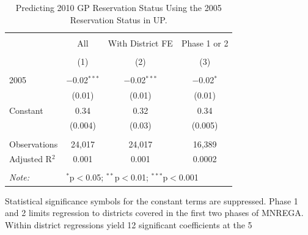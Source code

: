 \begin{table}[!htbp]
\centering
\begin{threeparttable}

  \caption{Predicting 2010 GP Reservation Status Using the 2005 Reservation Status in UP.} 
  \label{rand_or_no_up} 
\scriptsize 
\begin{tabular}{@{\extracolsep{0pt}}lccc} 
\\[-1.8ex]\hline 
\hline \\[-1.8ex] 
 & All & With District FE & Phase 1 or 2 \\ 
\\[-1.8ex] & (1) & (2) & (3)\\ 
\hline \\[-1.8ex] 
 2005 & $-$0.02$^{***}$ & $-$0.02$^{***}$ & $-$0.02$^{*}$ \\ 
  & (0.01) & (0.01) & (0.01) \\ 
  Constant & 0.34 & 0.32 & 0.34 \\ 
  & (0.004) & (0.03) & (0.005) \\ 
 \hline \\[-1.8ex] 
Observations & 24,017 & 24,017 & 16,389 \\ 
Adjusted R$^{2}$ & 0.001 & 0.001 & 0.0002 \\ 
\hline 
\hline \\[-1.8ex] 
\textit{Note:}  & \multicolumn{3}{l}{$^{*}$p$<$0.05; $^{**}$p$<$0.01; $^{***}$p$<$0.001} \\ 
\end{tabular} 
\begin{tablenotes}[flushleft]
\scriptsize
\item[] Statistical significance symbols for the constant terms are suppressed.
                   Phase 1 and 2 limits regression to districts covered in the first two phases of MNREGA.
                   Within district regressions yield 12 significant coefficients at the 5%
\end{tablenotes}
\end{threeparttable}
\end{table}
